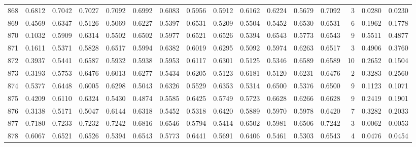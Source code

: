 \begin{tabular}{lrrrrrrrrrrrrrrr}
868 &      0.6812 &  0.7042 &  0.7027 &  0.7092 &  0.6992 &  0.6083 &  0.5956 &  0.5912 &  0.6162 &  0.6224 &   0.5679 &     0.7092 &      3 &                    0.0280 &                     0.0230 \\
869 &      0.4569 &  0.6347 &  0.5126 &  0.5069 &  0.6227 &  0.5397 &  0.6531 &  0.5209 &  0.5504 &  0.5452 &   0.6530 &     0.6531 &      6 &                    0.1962 &                     0.1778 \\
870 &      0.1032 &  0.5909 &  0.6314 &  0.5502 &  0.6502 &  0.5977 &  0.6521 &  0.6526 &  0.5394 &  0.6543 &   0.5773 &     0.6543 &      9 &                    0.5511 &                     0.4877 \\
871 &      0.1611 &  0.5371 &  0.5828 &  0.6517 &  0.5994 &  0.6382 &  0.6019 &  0.6295 &  0.5092 &  0.5974 &   0.6263 &     0.6517 &      3 &                    0.4906 &                     0.3760 \\
872 &      0.3937 &  0.5441 &  0.6587 &  0.5932 &  0.5938 &  0.5953 &  0.6117 &  0.6301 &  0.5125 &  0.5346 &   0.6589 &     0.6589 &     10 &                    0.2652 &                     0.1504 \\
873 &      0.3193 &  0.5753 &  0.6476 &  0.6013 &  0.6277 &  0.5434 &  0.6205 &  0.5123 &  0.6181 &  0.5120 &   0.6231 &     0.6476 &      2 &                    0.3283 &                     0.2560 \\
874 &      0.5377 &  0.6448 &  0.6005 &  0.6298 &  0.5043 &  0.6326 &  0.5529 &  0.6353 &  0.5314 &  0.6500 &   0.5376 &     0.6500 &      9 &                    0.1123 &                     0.1071 \\
875 &      0.4209 &  0.6110 &  0.6324 &  0.5430 &  0.4874 &  0.5585 &  0.6425 &  0.5749 &  0.5723 &  0.6628 &   0.6266 &     0.6628 &      9 &                    0.2419 &                     0.1901 \\
876 &      0.3138 &  0.5171 &  0.5047 &  0.6144 &  0.6318 &  0.5452 &  0.5318 &  0.6420 &  0.5889 &  0.5970 &   0.5978 &     0.6420 &      7 &                    0.3282 &                     0.2033 \\
877 &      0.7180 &  0.7233 &  0.7232 &  0.7242 &  0.6816 &  0.6546 &  0.5794 &  0.5414 &  0.6502 &  0.5981 &   0.6506 &     0.7242 &      3 &                    0.0062 &                     0.0053 \\
878 &      0.6067 &  0.6521 &  0.6526 &  0.5394 &  0.6543 &  0.5773 &  0.6441 &  0.5691 &  0.6406 &  0.5461 &   0.5303 &     0.6543 &      4 &                    0.0476 &                     0.0454 \\

\end{tabular}
